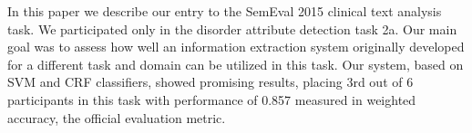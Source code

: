 In this paper we describe our entry to the SemEval 2015 clinical text analysis task. We participated only in the disorder attribute detection task 2a. Our main goal was to assess how well an information extraction system originally developed for a different task and domain can be utilized in this task. Our system, based on SVM and CRF classifiers, showed promising results, placing 3rd out of 6 participants in this task with performance of 0.857 measured in weighted accuracy, the official evaluation metric.
